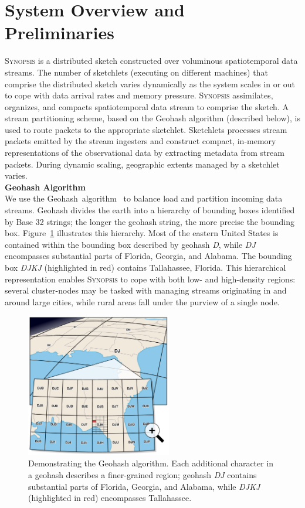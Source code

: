 \section{System Overview and Preliminaries}
\label{sec:system}
\textsc{Synopsis} is a distributed sketch constructed over voluminous spatiotemporal data streams.
The number of sketchlets (executing on different machines) that comprise the distributed sketch varies dynamically as the system scales in or out to cope with data arrival rates and memory pressure.
\textsc{Synopsis} assimilates, organizes, and compacts spatiotemporal data stream to comprise the sketch.
A stream partitioning scheme, based on the Geohash algorithm (described below), is used to route packets to the appropriate sketchlet.
Sketchlets processes stream packets emitted by the stream ingesters and construct compact, in-memory representations of the observational data by extracting metadata from stream packets.
During dynamic scaling, geographic extents managed by a sketchlet varies.
\vspace{1em} \\
\textbf{Geohash Algorithm} \\
We use the Geohash~algorithm~\cite{geohash} to balance load and partition incoming data streams. Geohash divides the earth into a hierarchy of bounding boxes identified by Base 32 strings; the longer the geohash string, the more precise the bounding box. Figure~\ref{fig:geohash} illustrates this hierarchy. Most of the eastern United States is contained within the bounding box described by geohash \emph{D}, while \emph{DJ} encompasses substantial parts of Florida, Georgia, and Alabama. The bounding box \emph{DJKJ} (highlighted in red) contains Tallahassee, Florida. This hierarchical representation enables \textsc{Synopsis} to cope with both low- and high-density regions: several cluster-nodes may be tasked with managing streams originating in and around large cities, while rural areas fall under the purview of a single node.

\begin{figure}[b!]
    \centerline{\includegraphics[width=2.5in]{figures/geohash.pdf}}
    \caption{Demonstrating the Geohash algorithm. Each additional character in a geohash describes a finer-grained region; geohash \emph{DJ} contains substantial parts of Florida, Georgia, and Alabama, while \emph{DJKJ} (highlighted in red) encompasses Tallahassee.}
    \label{fig:geohash}
\end{figure}

